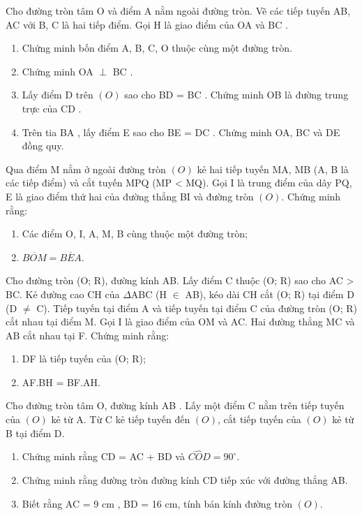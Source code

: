 \documentclass[%
    fontsize=12pt,%
    chapterprefix=false,%
    open=right,%
    twoside=false,%
    numbers=noenddot,%
    headings=optiontohead,%
    final,%
    DIV=15,%
    parskip=half %
]{scrbook}
\begin{document}
\begin{tuluan}
\item Cho đường tròn tâm O và điểm A nằm ngoài đường tròn. Vẽ các tiếp tuyến AB, AC với B, C là hai tiếp điểm. Gọi H là giao điểm của OA và BC .
\begin{enumerate}[label=\alph*)]
  \item[a)] Chứng minh bốn điểm A, B, C, O thuộc cùng một đường tròn.
  \item[b)] Chứng minh OA $\perp$ BC .
  \item[c)] Lấy điểm D trên $(O)$ sao cho BD = BC . Chứng minh OB là đường trung trực của CD .
  \item[d)] Trên tia BA , lấy điểm E sao cho BE = DC . Chứng minh OA, BC và DE đồng quy.
\end{enumerate}

\item Qua điểm M nằm ở ngoài đường tròn $(O)$ kẻ hai tiếp tuyến MA, MB (A, B là các tiếp điểm) và cắt tuyến MPQ (MP < MQ). Gọi I là trung điểm của dây PQ, E là giao điểm thứ hai của đường thẳng BI và đường tròn $(O)$. Chứng minh rằng:
\begin{enumerate}[label=\alph*)]
  \item[a)] Các điểm O, I, A, M, B cùng thuộc một đường tròn;
  \item[b)] $ \overline{BOM} = \overline{BEA} $.
\end{enumerate}

\item Cho đường tròn (O; R), đường kính AB. Lấy điểm C thuộc (O; R) sao cho AC > BC. Kẻ đường cao CH của $\Delta$ABC (H $\in$ AB), kéo dài CH cắt (O; R) tại điểm D (D $\neq$ C). Tiếp tuyến tại điểm A và tiếp tuyến tại điểm C của đường tròn (O; R) cắt nhau tại điểm M. Gọi I là giao điểm của OM và AC. Hai đường thẳng MC và AB cắt nhau tại F. Chứng minh rằng:
\begin{enumerate}[label=\alph*)]
  \item[a)] DF là tiếp tuyến của (O; R);
  \item[b)] AF.BH = BF.AH.
\end{enumerate}

\item Cho đường tròn tâm O, đường kính AB . Lấy một điểm C nằm trên tiếp tuyến của $(O)$ kẻ từ A. Từ C kẻ tiếp tuyến đến $(O)$, cắt tiếp tuyến của $(O)$ kẻ từ B tại điểm D.
\begin{enumerate}[label=\alph*)]
  \item[a)] Chứng minh rằng CD = AC + BD và $ \widehat{COD} = 90^\circ $.
  \item[b)] Chứng minh rằng đường tròn đường kính CD tiếp xúc với đường thẳng AB.
  \item[c)] Biết rằng AC = 9 cm , BD = 16 cm, tính bán kính đường tròn $(O)$.
\end{enumerate}

\end{tuluan}
\end{document}
